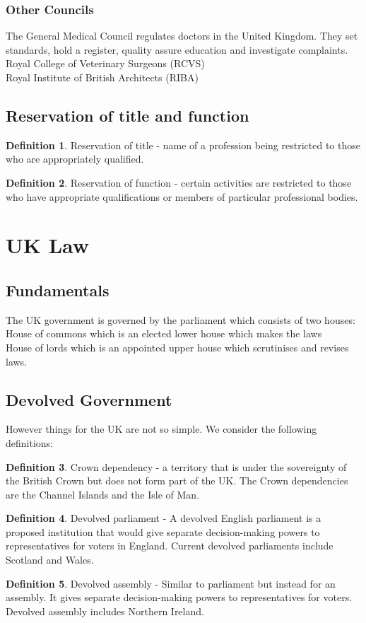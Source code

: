 \documentclass[a4paper]{article}
\theoremstyle{plain}
\theoremstyle{definition}
\newtheorem{defn}{Definition}[section]
\theoremstyle{remark}
\begin{document}
\subsubsection{Other Councils}
The General Medical Council regulates doctors in the United Kingdom. They set standards, hold a register, quality assure education and investigate complaints. \\
Royal College of Veterinary Surgeons (RCVS) \\
Royal Institute of British Architects (RIBA)
\subsection{Reservation of title and function}
\begin{defn}
	Reservation of title - name of a profession being restricted to those who are appropriately qualified.
\end{defn}
\begin{defn}
	Reservation of function - certain activities are restricted to those who have appropriate qualifications or members of particular professional bodies.
\end{defn}
\section{UK Law}
\subsection{Fundamentals}
The UK government is governed by the parliament which consists of two houses:\\
House of commons which is an elected lower house which makes the laws  \\
House of lords which is an appointed upper house which scrutinises and revises laws.
\subsection{Devolved Government}
However things for the UK are not so simple. We consider the following definitions:
\begin{defn}
	Crown dependency - a territory that is under the sovereignty of the British Crown but does not form part of the UK. The Crown dependencies are the Channel Islands and the Isle of Man.
\end{defn}
\begin{defn}
	Devolved parliament - A devolved English parliament is a proposed institution that would give separate decision-making powers to representatives for voters in England. Current devolved parliaments include Scotland and Wales.
\end{defn}
\begin{defn}
	Devolved assembly - Similar to parliament but instead for an assembly. It gives separate decision-making powers to representatives for voters. Devolved assembly includes Northern Ireland.
\end{defn}
\end{document}
